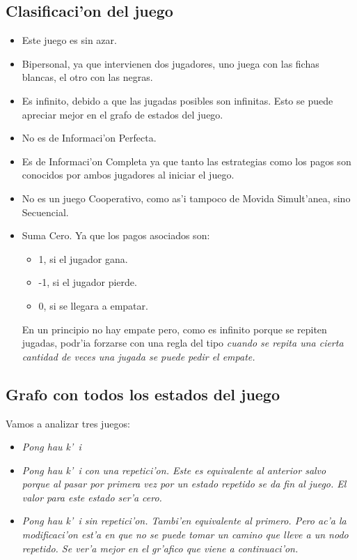 \subsection{Clasificaci'on del juego}
\begin{itemize}
\item Este juego es sin azar.

\item Bipersonal, ya que intervienen dos jugadores, uno juega con las fichas blancas, el otro con las negras.

\item Es infinito, debido a que las jugadas posibles son infinitas. Esto se puede apreciar mejor en el grafo de estados del juego.

\item No es de Informaci'on Perfecta.

\item Es de Informaci'on Completa ya que tanto las estrategias como los pagos son conocidos por ambos jugadores al iniciar el juego.

\item No es un juego Cooperativo, como as'i tampoco de Movida Simult'anea, sino Secuencial.

\item Suma Cero. Ya que los pagos asociados son:
\begin{itemize}
\item 1, si el jugador gana.
\item -1, si el jugador pierde.
\item 0, si se llegara a empatar.
\end{itemize}
En un principio no hay empate pero, como es infinito porque se repiten jugadas, podr'ia forzarse con una regla del tipo \it{cuando se repita una cierta cantidad de veces una jugada se puede pedir el empate}.
\end{itemize}

\subsection{Grafo con todos los estados del juego}

Vamos a analizar tres juegos: 

\begin{itemize}
\item \it{Pong hau k'\ i}
\item \it{Pong hau k'\ i con una repetici'on}. Este es equivalente al anterior salvo porque al pasar por primera vez por un estado repetido se da fin al juego. El valor para este estado ser'a cero.
\item \it{Pong hau k'\ i sin repetici'on}. Tambi'en equivalente al primero. Pero ac'a la modificaci'on est'a en que no se puede tomar un camino que lleve a un nodo repetido. Se ver'a mejor en el gr'afico que viene a continuaci'on.
\end{itemize}


